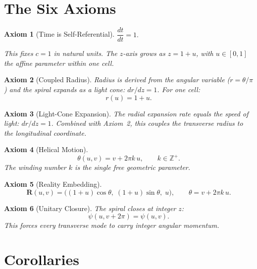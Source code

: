 \documentclass[12pt]{amsart}
\newtheorem{axiom}{Axiom}
\begin{document}

\section{The Six Axioms}

\begin{axiom}[Time is Self-Referential]
$\dfrac{dt}{dt} = 1.$

This fixes $c = 1$ in natural units. The $z$-axis grows as $z = 1 + u$, with $u \in [0,1]$
the affine parameter within one cell.
\end{axiom}

\begin{axiom}[Coupled Radius]
Radius is derived from the angular variable ($r = \theta/\pi$) and the spiral expands as a
light cone: $dr/dz = 1$. For one cell:
\[
  r(u) = 1 + u.
\]
\end{axiom}

\begin{axiom}[Light-Cone Expansion]
The radial expansion rate equals the speed of light: $dr/dz = 1$. Combined with Axiom~2,
this couples the transverse radius to the longitudinal coordinate.
\end{axiom}

\begin{axiom}[Helical Motion]
\[
  \theta(u,v) = v + 2\pi k\, u, \qquad k \in \mathbb{Z}^+.
\]
The winding number $k$ is the single free geometric parameter.
\end{axiom}

\begin{axiom}[Reality Embedding]
\[
  \mathbf{R}(u,v) = \bigl((1+u)\cos\theta,\; (1+u)\sin\theta,\; u\bigr),
  \qquad \theta = v + 2\pi k\, u.
\]
\end{axiom}

\begin{axiom}[Unitary Closure]
The spiral closes at integer $z$:
\[
  \psi(u, v + 2\pi) = \psi(u,v).
\]
This forces every transverse mode to carry integer angular momentum.
\end{axiom}


\section{Corollaries}
\end{document}
